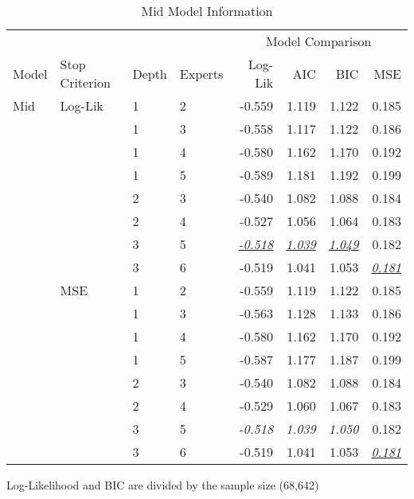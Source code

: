 \documentclass[12pt]{article}
\newcommand{\ti}[1]{\textit{#1}}
\newcommand{\iu}[1]{\underline{\textit{#1}}}
\newcommand{\T}{\rule{0pt}{2.5ex}}       %
\begin{document}
\begin{table} \centering
  \caption{Mid Model Information}
  \begin{threeparttable}
    {\footnotesize
    \begin{tabular}[r]{l l l l r r r r}
  \cmidrule{1-8}
        &            &        &         &  \multicolumn{4}{c}{Model Comparison} \\ 
   \cmidrule(l){5-8}
Model   & Stop Criterion  &  Depth & Experts & Log-Lik & AIC    & BIC    & MSE   \\ 
  \cmidrule{1-8}

  Mid     &  Log-Lik   &   1    &    2    & -0.559  & 1.119  & 1.122  & 0.185 \\
  &            &   1    &    3    & -0.558  & 1.117  & 1.122  & 0.186 \\
  &            &   1    &    4    & -0.580  & 1.162  & 1.170  & 0.192 \\
  &            &   1    &    5    & -0.589  & 1.181  & 1.192  & 0.199 \\
  &            &   2    &    3    & -0.540  & 1.082  & 1.088  & 0.184 \\
  &            &   2    &    4    & -0.527  & 1.056  & 1.064  & 0.183 \\
  &            &   3    &    5    & \iu{-0.518}  & \iu{1.039}  & \iu{1.049}  & 0.182 \\
  &            &   3    &    6    & -0.519  & 1.041  & 1.053  & \iu{0.181} \\ \T
  &  MSE       &   1    &    2    & -0.559  & 1.119  & 1.122  & 0.185 \\
  &            &   1    &    3    & -0.563  & 1.128  & 1.133  & 0.186 \\
  &            &   1    &    4    & -0.580  & 1.162  & 1.170  & 0.192 \\
  &            &   1    &    5    & -0.587  & 1.177  & 1.187  & 0.199 \\
  &            &   2    &    3    & -0.540  & 1.082  & 1.088  & 0.184 \\
  &            &   2    &    4    & -0.529  & 1.060  & 1.067  & 0.183 \\
  &            &   3    &    5    & \ti{-0.518}  & \ti{1.039}  & \ti{1.050}  & 0.182 \\
  &            &   3    &    6    & -0.519  & 1.041  & 1.053  & \iu{0.181} \\
  \cmidrule(l){1-8}
    \end{tabular}
    }
    \begin{tablenotes}
      \item{\footnotesize Log-Likelihood and BIC are divided by the sample size (68,642)}
    \end{tablenotes} \label{tbl:HME_spec_mid}
  \end{threeparttable}
\end{table}
      
\end{document}
